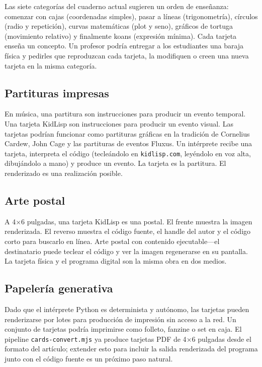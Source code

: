 \documentclass[10pt,letterpaper,twocolumn]{article}
\begin{document}
Las siete categor\'ias del cuaderno actual sugieren un orden de ense\~nanza: comenzar con cajas (coordenadas simples), pasar a l\'ineas (trigonometr\'ia), c\'irculos (radio y repetici\'on), curvas matem\'aticas (plot y seno), gr\'aficos de tortuga (movimiento relativo) y finalmente koans (expresi\'on m\'inima). Cada tarjeta ense\~na un concepto. Un profesor podr\'ia entregar a los estudiantes una baraja f\'isica y pedirles que reproduzcan cada tarjeta, la modifiquen o creen una nueva tarjeta en la misma categor\'ia.

\subsection{Partituras impresas}

En m\'usica, una partitura son instrucciones para producir un evento temporal. Una tarjeta KidLisp son instrucciones para producir un evento visual. Las tarjetas podr\'ian funcionar como partituras gr\'aficas en la tradici\'on de Cornelius Cardew, John Cage y las partituras de eventos Fluxus. Un int\'erprete recibe una tarjeta, interpreta el c\'odigo (tecle\'andolo en \texttt{kidlisp.com}, ley\'endolo en voz alta, dibuj\'andolo a mano) y produce un evento. La tarjeta es la partitura. El renderizado es una realizaci\'on posible.

\subsection{Arte postal}

A 4$\times$6 pulgadas, una tarjeta KidLisp es una postal. El frente muestra la imagen renderizada. El reverso muestra el c\'odigo fuente, el handle del autor y el c\'odigo corto para buscarlo en l\'inea. Arte postal con contenido ejecutable---el destinatario puede teclear el c\'odigo y ver la imagen regenerarse en su pantalla. La tarjeta f\'isica y el programa digital son la misma obra en dos medios.

\subsection{Papeler\'ia generativa}

Dado que el int\'erprete Python es determinista y aut\'onomo, las tarjetas pueden renderizarse por lotes para producci\'on de impresi\'on sin acceso a la red. Un conjunto de tarjetas podr\'ia imprimirse como folleto, fanzine o set en caja. El pipeline \texttt{cards-convert.mjs} ya produce tarjetas PDF de 4$\times$6 pulgadas desde el formato del art\'iculo; extender esto para incluir la salida renderizada del programa junto con el c\'odigo fuente es un pr\'oximo paso natural.
\end{document}

